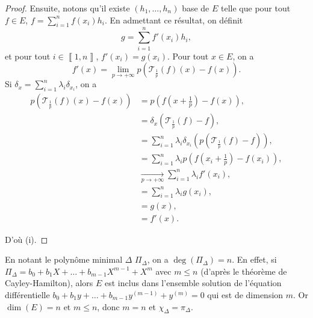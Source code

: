 \documentclass[12pt]{article}
\begin{document}
\begin{proof}
	Ensuite, notons qu'il existe $(h_1,\dots,h_n)$ base de $E$ telle que pour tout $f\in E$, $f=\sum_{i=1}^{n}f(x_i)h_i$. En admettant ce résultat, on définit 
	\begin{equation}
		g=\sum_{i=1}^{n}f'(x_i)h_i,
	\end{equation}
	et pour tout $i\in\left\llbracket1,n\right\rrbracket$, $f'(x_i)=g(x_i)$. Pour tout $x\in E$, on a 
	\begin{equation}
		f'(x)=\lim\limits_{p\to+\infty}p\left(\mathcal{T}_{\frac{1}{p}}(f)(x)-f(x)\right).
	\end{equation}
	Si $\delta_x=\sum_{i=1}^{n}\lambda_i \delta_{x_i}$, on a 
	\begin{align}
		p\left(\mathcal{T}_{\frac{1}{p}}(f)(x)-f(x)\right)
		&=p\left(f\left(x+\frac{1}{p}\right)-f(x)\right),\\
		&=\delta_x\left(\mathcal{T}_{\frac{1}{p}}(f)-f\right),\\
		&=\sum_{i=1}^{n}\lambda_i\delta_{x_i}\left(p\left(\mathcal{T}_{\frac{1}{p}}(f)-f\right)\right),\\
		&=\sum_{i=1}^{n}\lambda_i p\left(f\left(x_i+\frac{1}{p}\right)-f(x_i)\right),\\
		&\xrightarrow[p\to+\infty]{}\sum_{i=1}^{n}\lambda_i f'(x_i),\\
		&=\sum_{i=1}^{n}\lambda_i g(x_i),\\
		&=g(x),\\
		&=f'(x).
	\end{align}

	D'où (i).
\end{proof}

\begin{remark}
	En notant le polynôme minimal $\Delta$ $\Pi_{\Delta}$, on a $\deg(\Pi_{\Delta})=n$. En effet, si $\Pi_{\Delta}=b_0+b_1 X+\dots+b_{m-1}X^{m-1}+X^{m}$ avec $m\leqslant n$ (d'après le théorème de Cayley-Hamilton), alors $E$ est inclus dans l'ensemble solution de l'équation différentielle $b_0+b_1 y+\dots+b_{m-1}y^{(m-1)}+y^{(m)}=0$ qui est de dimension $m$. Or $\dim(E)=n$ et $m\leqslant n$, donc $m=n$ et $\chi_{\Delta}=\pi_{\Delta}$.
\end{remark}
\end{document}
